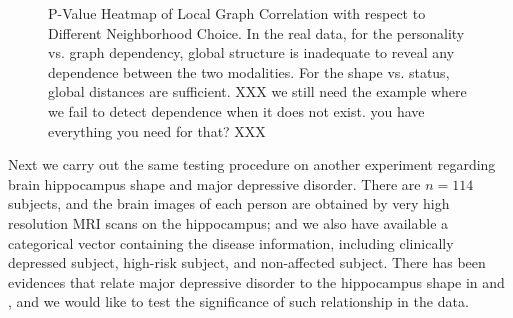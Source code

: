 \documentclass[11pt]{article}
\begin{document}
\begin{figure}[htbp]
\centering
{}
\hfil
\centering
{}
\hfil
\centering
{}
\caption{P-Value Heatmap of Local Graph Correlation with respect to Different Neighborhood Choice.  In the real data, for the personality vs. graph dependency, global structure is inadequate to reveal any dependence between the two modalities.  For the shape vs. status,  global distances are sufficient.  XXX we still need the example where we fail to detect dependence when it does not exist.  you have everything you need for that? XXX}
\label{figReal}
\end{figure}

Next we carry out the same testing procedure on another experiment regarding brain hippocampus shape and major depressive disorder. There are $n=114$ subjects, and the brain images of each person are obtained by very high resolution MRI scans on the hippocampus; and we also have available a categorical vector containing the disease information, including clinically depressed subject, high-risk subject, and non-affected subject. There has been evidences that relate major depressive disorder to the hippocampus shape in \cite{ParkEtAl2011} and \cite{PosenerEtAl2003}, and we would like to test the significance of such relationship in the data. 
\end{document}
